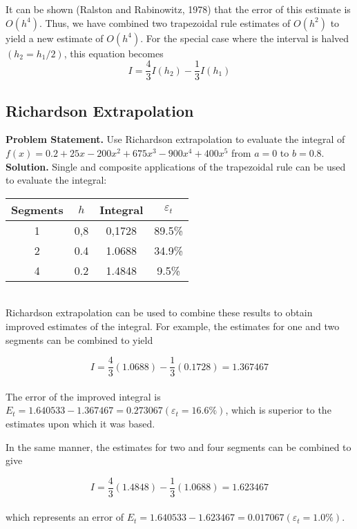 \documentclass[../main.tex]{subfiles}
\begin{document}
It can be shown (Ralston and Rabinowitz, 1978) that the error of this estimate is
$O(h^4)$. Thus, we have combined two trapezoidal rule estimates of $O(h^2)$ to yield a new estimate of $O(h^4)$. For the special case where the interval is halved $(h_2 = h_1/2)$, this equation becomes
\begin{equation}
	\tag{20.5}
	I=\dfrac{4}{3}I(h_2)-\dfrac{1}{3}I(h_1)
\end{equation}

\subsection{Richardson Extrapolation}
\textbf{Problem Statement.} Use Richardson extrapolation to evaluate the integral of $f(x) =
0.2 + 25x − 200x^2 + 675x^3 − 900x^4 + 400x^5$ from $a = 0$ to $b = 0.8.$\\
\vspace{0.1in}
\textbf{Solution.} Single and composite applications of the trapezoidal rule can be used to evaluate the integral:\\


\begin{tabular}{cccc}
	\hline
	\textbf{Segments} & \textbf{$h$} & \textbf{Integral} & \textbf{$\varepsilon_t$}\\ \hline
	1 & 0,8 & 0,1728 & 89.5\%\\
	2 & 0.4 & 1.0688 & 34.9\%\\
	4 & 0.2 & 1.4848 & 9.5\%\\ \hline
\end{tabular}\\

\vspace{0.5in}
Richardson extrapolation can be used to combine these results to obtain improved estimates
of the integral. For example, the estimates for one and two segments can be combined to yield
	
	$$I=\dfrac{4}{3}(1.0688)-\dfrac{1}{3}(0.1728)=1.367467$$\\
The error of the improved integral is $E_t = 1.640533 − 1.367467 = 0.273067(\varepsilon_t = 16.6\%)$, 
which is superior to the estimates upon which it was based.

In the same manner, the estimates for two and four segments can be combined to give

	$$I=\dfrac{4}{3}(1.4848)-\dfrac{1}{3}(1.0688)=1.623467$$\\
which represents an error of $E_t = 1.640533 − 1.623467 = 0.017067 (\varepsilon_t = 1.0\%)$.
\end{document}
